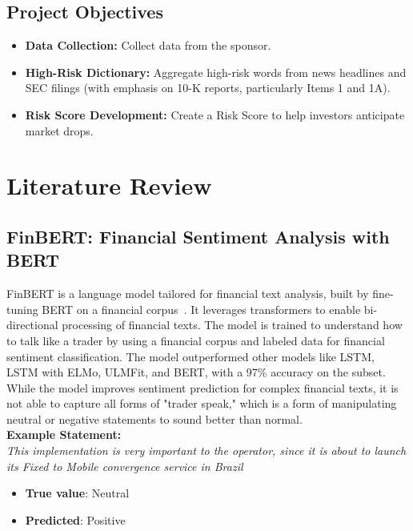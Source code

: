 \documentclass[twocolumn]{article}
\begin{document}
\subsection{Project Objectives}
\begin{itemize}
    \item \textbf{Data Collection:} Collect data from the sponsor.
    \item \textbf{High-Risk Dictionary:} Aggregate high-risk words from news headlines and SEC filings (with emphasis on 10-K reports, particularly Items 1 and 1A).
    \item \textbf{Risk Score Development:} Create a Risk Score to help investors anticipate market drops.
\end{itemize}

\section{Literature Review}
\subsection{FinBERT: Financial Sentiment Analysis with BERT}
FinBERT is a language model tailored for financial text analysis, built by fine-tuning BERT on a financial corpus~\cite{genc2020finbert}. It leverages transformers to enable bi-directional processing of financial texts. The model is trained to understand how to talk like a trader by using a financial corpus and labeled data for financial sentiment classification. The model outperformed other models like LSTM, LSTM with ELMo, ULMFit, and BERT, with a 97\% accuracy on the subset. While the model improves sentiment prediction for complex financial texts, it is not able to capture all forms of "trader speak," which is a form of manipulating neutral or negative statements to sound better than normal. \\
\textbf{Example Statement:} \\ 
\textit{This implementation is very important to the operator, since it is about to launch its Fixed to Mobile convergence service in Brazil}
\begin{itemize}
    \item \textbf{True value}: Neutral
    \item \textbf{Predicted}: Positive
\end{itemize}
\end{document}
